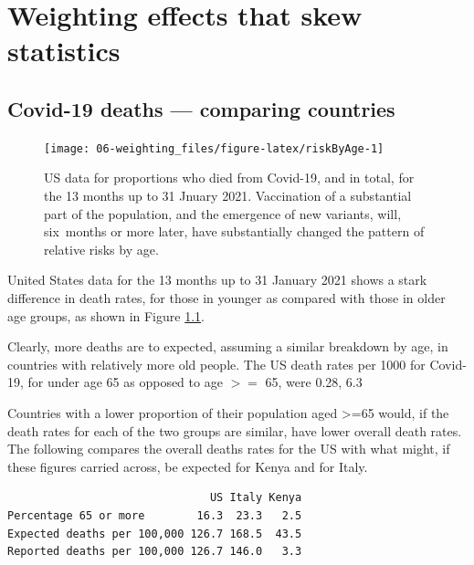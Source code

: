 \documentclass[
  10pt,
  b5paper]{book}
\begin{document}
\hypertarget{sec:yule1}{%
\chapter{Weighting effects that skew statistics}\label{sec:yule1}}

\hypertarget{covid-19-deaths-comparing-countries}{%
\section{Covid-19 deaths --- comparing countries}\label{covid-19-deaths-comparing-countries}}

\begin{figure}[H]

{\centering \texttt{[image: 06-weighting\_files/figure-latex/riskByAge-1]} 

}

\caption{US data for proportions who died from Covid-19, and in total,
for the 13 months up to 31 Jnuary 2021. Vaccination of a substantial 
part of the population, and the emergence of new variants, will,
six months or more later, have substantially changed the pattern
of relative risks by age.}\label{fig:riskByAge}
\end{figure}

United States data for the 13 months up to 31 January 2021 shows
a stark difference in death rates, for those in younger as
compared with those in older age groups, as shown in Figure
\ref{fig:riskByAge}.

Clearly, more deaths are to expected, assuming a similar
breakdown by age, in countries with relatively more old people. The US
death rates per 1000 for Covid-19, for under age 65 as opposed to age \(>=\) 65, were 0.28, 6.3

Countries with a lower proportion of their population aged \textgreater=65
would, if the death rates for each of the two groups are similar,
have lower overall death rates. The following compares the
overall deaths rates for the US with what might, if these figures
carried across, be expected for Kenya and for Italy.

\begin{verbatim}
                               US Italy Kenya
Percentage 65 or more        16.3  23.3   2.5
Expected deaths per 100,000 126.7 168.5  43.5
Reported deaths per 100,000 126.7 146.0   3.3
\end{verbatim}
\end{document}
